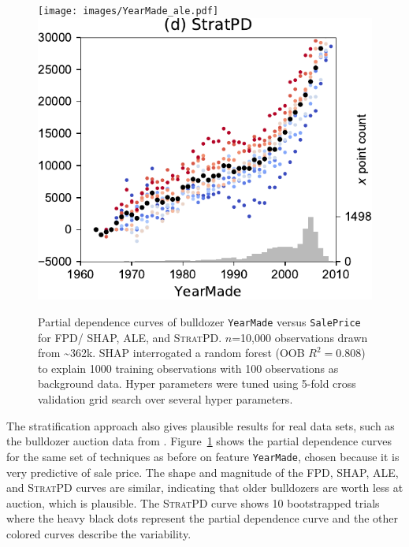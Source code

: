 \documentclass[smallextended]{svjour3}       %
\newcommand{\figref}[1]{Figure~\ref{#1}}
\newcommand{\spd}{\fontfamily{cmr}\textsc{\small StratPD}}
\begin{document}
\begin{figure}[!htbp]
\begin{center}
\texttt{[image: images/YearMade\_ale.pdf]}~~
\includegraphics[scale=0.29]{images/bulldozer_YearMade_stratpd.pdf}\vspace{-2mm}
\caption{\small Partial dependence curves of bulldozer {\tt YearMade} versus {\tt SalePrice} for FPD/ SHAP, ALE, and \spd. $n$=10,000 observations drawn from \textasciitilde{}362k. SHAP interrogated a random forest (OOB $R^2=0.808$) to explain 1000 training observations with 100 observations as background data. Hyper parameters were tuned using 5-fold cross validation grid search over several hyper parameters.}
\label{fig:yearmade}
\end{center}
\end{figure}


The stratification approach also gives plausible results for real data sets, such as the bulldozer auction data from \cite{bulldozer}. \figref{fig:yearmade} shows the partial dependence curves for the same set of techniques as before on feature {\tt\small YearMade}, chosen because it is very predictive of sale price. The shape and magnitude of the FPD, SHAP, ALE, and \spd{} curves are similar, indicating that older bulldozers are worth less at auction, which is plausible. The \spd{} curve shows 10 bootstrapped trials where the heavy black dots represent the partial dependence curve and the other colored curves describe the variability. 
\end{document}
